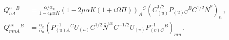 \begin{equation}\label{theqs}
\begin{split}
Q^u_{nA}{}^B&=\frac{\alpha/\alpha_u}{1-4\mu\alpha K}(1-2\mu\alpha K(1+i\Omega\Pi))_A{}^C
(C_{(u)}^{1/2}P_{(u)C}{}^BC^{1/2}{\bar N}^u)_n\,,\\
Q^{uv}_{mnA}{}^B&=\frac{\alpha_v}{\alpha_u}
(P_{(u)A}^{-1}{}^CU_{(u)}C^{1/2}{\bar N}^{uv}C^{-1/2}U_{(v)}P_{(v)C}^{-1}{}^B)_{mn}\,.
\end{split}
\end{equation}

